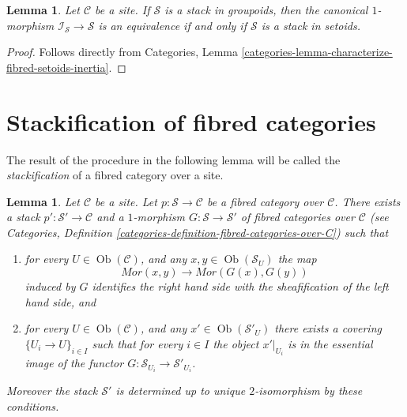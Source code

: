 \documentclass{stacks-project}
\theoremstyle{plain}
\newtheorem{lemma}[subsection]{Lemma}
\theoremstyle{definition}
\theoremstyle{remark}
\numberwithin{equation}{subsection}
\def\Ob{\mathop{\mathrm{Ob}}\nolimits}
\begin{document}
\begin{lemma}
\label{lemma-characterize-stack-in-setoids}
Let $\mathcal{C}$ be a site.
If $\mathcal{S}$ is a stack in groupoids, then the
canonical $1$-morphism $\mathcal{I}_\mathcal{S} \to \mathcal{S}$
is an equivalence if and only if $\mathcal{S}$ is a stack in setoids.
\end{lemma}

\begin{proof}
Follows directly from
Categories, Lemma \ref{categories-lemma-characterize-fibred-setoids-inertia}.
\end{proof}




\section{Stackification of fibred categories}
\label{section-stackify}

\noindent
The result of the procedure in the following lemma will be called the
{\it stackification} of a fibred category over a site.

\begin{lemma}
\label{lemma-stackify}
Let $\mathcal{C}$ be a site.
Let $p : \mathcal{S} \to \mathcal{C}$ be a fibred category over $\mathcal{C}$.
There exists a stack $p' : \mathcal{S}' \to \mathcal{C}$ and a
$1$-morphism $G : \mathcal{S} \to \mathcal{S}'$
of fibred categories over $\mathcal{C}$ (see
Categories, Definition \ref{categories-definition-fibred-categories-over-C})
such that
\begin{enumerate}
\item for every $U \in \Ob(\mathcal{C})$, and any
$x, y \in \Ob(\mathcal{S}_U)$ the map
$$
\mathit{Mor}(x, y) \longrightarrow \mathit{Mor}(G(x), G(y))
$$
induced by $G$ identifies the right hand side with the sheafification
of the left hand side, and
\item for every $U \in \Ob(\mathcal{C})$, and any
$x' \in \Ob(\mathcal{S}'_U)$ there exists a covering
$\{U_i \to U\}_{i \in I}$ such that for every $i \in I$ the
object $x'|_{U_i}$ is in the essential image of the
functor $G : \mathcal{S}_{U_i} \to \mathcal{S}'_{U_i}$.
\end{enumerate}
Moreover the stack $\mathcal{S}'$ is determined up to unique
$2$-isomorphism by these conditions.
\end{lemma}
\end{document}
